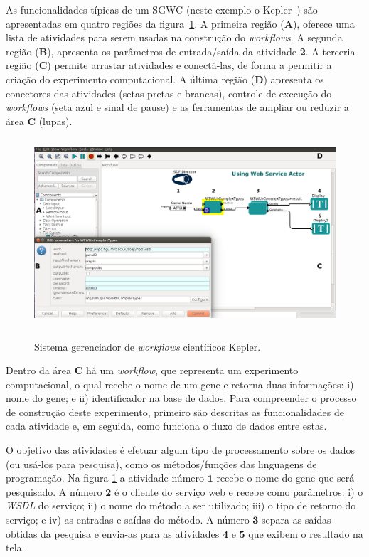 As funcionalidades típicas de um SGWC (neste exemplo o Kepler~\cite{kepler2014}) são apresentadas em quatro regiões da figura~\ref{figura_SGWC_Kepler_exemplo_de_workflow}. A primeira região (\textbf{A}), oferece uma lista de atividades para serem usadas na construção do \emph{workf\mbox{}lows}. A segunda região (\textbf{B}), apresenta os parâmetros de entrada/saída da atividade \textbf{2}. A terceria região (\textbf{C}) permite arrastar atividades e conectá-las, de forma a permitir a criação do experimento computacional. A última região (\textbf{D}) apresenta os conectores das atividades (setas pretas e brancas), controle de execução do \emph{workflows} (seta azul e sinal de pause) e as ferramentas de ampliar ou reduzir a área \textbf{C} (lupas).
\begin{figure}[!hbt]
    \centering  
    \caption[Sistema gerenciador de \emph{workf\mbox{}low} científ\mbox{}ico Kepler]{Sistema gerenciador de \emph{workf\mbox{}lows} científ\mbox{}icos Kepler.}
    \includegraphics[width=13cm,height=7cm]{./secoes/conceitosFundamentais/pics/img/webService.png}    
	\label{figura_SGWC_Kepler_exemplo_de_workflow}
\end{figure}

Dentro da área \textbf{C} há um \emph{workf\mbox{}low}, que representa um experimento computacional, o qual recebe o nome de um gene e retorna duas informações: i) nome do gene; e ii) identificador na base de dados. Para compreender o processo de construção deste experimento, primeiro são descritas as funcionalidades de cada atividade e, em seguida, como funciona o fluxo de dados entre estas.

O objetivo das atividades é efetuar algum tipo de processamento sobre os dados (ou usá-los para pesquisa), como os métodos/funções das linguagens de programação. Na figura \ref{figura_SGWC_Kepler_exemplo_de_workflow} a atividade número \(\mathbf{1}\) recebe o nome do gene que será pesquisado. A número \(\mathbf{2}\) é o cliente do serviço web e recebe como parâmetros: i) o \emph{WSDL} do serviço; ii) o nome do método a ser utilizado; iii) o tipo de retorno do serviço; e iv) as entradas e saídas do método. A número \(\mathbf{3}\) separa as saídas obtidas da pesquisa e envia-as para as atividades \(\mathbf{4}\) e \(\mathbf{5}\) que exibem o resultado na tela.

